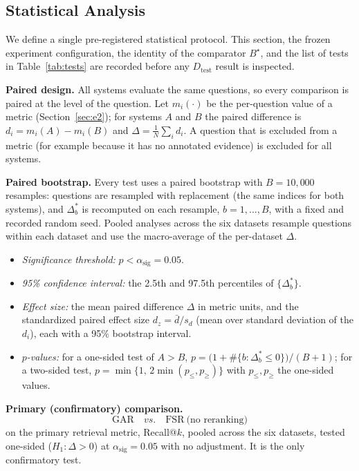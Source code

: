 \documentclass[11pt,a4paper]{article}
\begin{document}
\subsection{Statistical Analysis}
\label{sec:stats}

We define a single pre-registered statistical protocol. This section, the frozen experiment configuration, the identity of the comparator $B^\star$, and the list of tests in Table~\ref{tab:tests} are recorded before any $D_{\mathrm{test}}$ result is inspected.

\textbf{Paired design.} All systems evaluate the same questions, so every comparison is paired at the level of the question. Let $m_i(\cdot)$ be the per-question value of a metric (Section~\ref{sec:e2}); for systems $A$ and $B$ the paired difference is $d_i=m_i(A)-m_i(B)$ and $\Delta=\frac1N\sum_i d_i$. A question that is excluded from a metric (for example because it has no annotated evidence) is excluded for all systems.

\textbf{Paired bootstrap.} Every test uses a paired bootstrap with $B=10{,}000$ resamples: questions are resampled with replacement (the same indices for both systems), and $\Delta^{*}_b$ is recomputed on each resample, $b=1,\ldots,B$, with a fixed and recorded random seed. Pooled analyses across the six datasets resample questions within each dataset and use the macro-average of the per-dataset $\Delta$.
\begin{itemize}[leftmargin=1.5em]
\item \emph{Significance threshold:} $p<\alpha_{\mathrm{sig}}=0.05$.
\item \emph{95\% confidence interval:} the 2.5th and 97.5th percentiles of $\{\Delta^{*}_b\}$.
\item \emph{Effect size:} the mean paired difference $\Delta$ in metric units, and the standardized paired effect size $d_z=\bar d/s_d$ (mean over standard deviation of the $d_i$), each with a 95\% bootstrap interval.
\item \emph{$p$-values:} for a one-sided test of $A>B$, $p=\big(1+\#\{b:\Delta^{*}_b\le 0\}\big)/(B+1)$; for a two-sided test, $p=\min\{1,\,2\min(p_{\le},p_{\ge})\}$ with $p_{\le},p_{\ge}$ the one-sided values.
\end{itemize}

\textbf{Primary (confirmatory) comparison.}
\[
\text{GAR}\quad vs.\quad \mathrm{FSR}\ \text{(no reranking)}
\]
on the primary retrieval metric, Recall@$k$, pooled across the six datasets, tested one-sided ($H_1:\Delta>0$) at $\alpha_{\mathrm{sig}}=0.05$ with no adjustment. It is the only confirmatory test.
\end{document}
